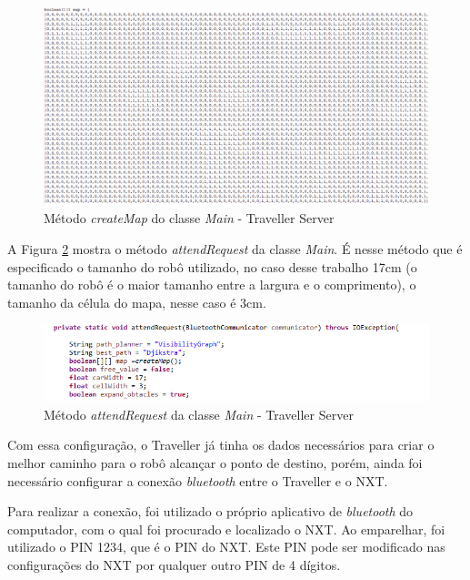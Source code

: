 \FloatBarrier
\begin{figure}[!h]
\centering
\includegraphics[keepaspectratio=true,scale=0.7, angle = 90]{figuras/criacaoMapa.png}
\caption{Método \textit{createMap} do classe \textit{Main} - Traveller Server}
\label{criacaoMapa}
\end{figure}

	A Figura \ref{configTravellerRobo} mostra o método \textit{attendRequest} da classe \textit{Main}. É nesse método que é especificado o tamanho do robô utilizado, no caso desse trabalho 17cm (o tamanho do robô é o maior tamanho entre a largura e o comprimento), o tamanho da célula do mapa, nesse caso é 3cm.

\FloatBarrier
\begin{figure}[!h]
\centering
\includegraphics[keepaspectratio=true,scale=0.7]{figuras/configTravellerRobo.png}
\caption{Método \textit{attendRequest} da classe \textit{Main} - Traveller Server}
\label{configTravellerRobo}
\end{figure}

	Com essa configuração, o Traveller já tinha os dados necessários para criar o melhor caminho para o robô alcançar o ponto de destino, porém, ainda foi necessário configurar a conexão \textit{bluetooth} entre o Traveller e o NXT. 
	
	Para realizar a conexão, foi utilizado o próprio aplicativo de \textit{bluetooth} do computador, com o qual foi procurado e localizado o NXT. Ao emparelhar, foi utilizado o PIN 1234, que é o PIN do NXT. Este PIN pode ser modificado nas configurações do NXT por qualquer outro PIN de 4 dígitos.

